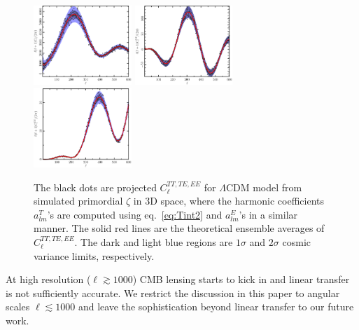 \begin{figure}
  \includegraphics[width=0.33\textwidth]{ClTT_proj.pdf}%
  \includegraphics[width=0.33\textwidth]{ClTE_proj.pdf}%
  \includegraphics[width=0.33\textwidth]{ClEE_proj.pdf}
  \caption{The black dots are projected $C_\ell^{TT,TE,EE}$ for $\Lambda$CDM model from simulated primordial $\zeta$ in 3D space, where the harmonic coefficients $a_{lm}^T$'s are computed using eq.~\eqref{eq:Tint2} and $a_{lm}^E$'s in a similar manner. The solid red lines are the theoretical ensemble averages of $C_\ell^{TT,TE,EE}$. The dark and light blue regions are $1\sigma$ and $2\sigma$ cosmic variance limits, respectively. \label{fig:Clproj}}
\end{figure} 


At high resolution ($\ell \gtrsim 1000$) CMB lensing starts to kick in and linear transfer is not sufficiently accurate. We restrict the discussion in this paper to angular scales $\ell \lesssim 1000$ and leave the sophistication beyond linear transfer to our future work.


